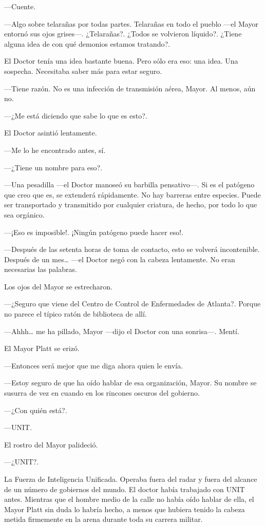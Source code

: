 ---Cuente.

---Algo sobre telarañas por todas partes. Telarañas en todo el pueblo
---el Mayor entornó sus ojos grises---. ¿Telarañas?. ¿Todos se volvieron
líquido?. ¿Tiene alguna idea de con qué demonios estamos tratando?.

El Doctor tenía una idea bastante buena. Pero sólo era eso: una idea.
Una sospecha. Necesitaba saber más para estar seguro.

---Tiene razón. No es una infección de transmisión aérea, Mayor. Al
menos, aún no.

---¿Me está diciendo que sabe lo que es esto?.

El Doctor asintió lentamente.

---Me lo he encontrado antes, sí.

---¿Tiene un nombre para eso?.

---Una pesadilla ---el Doctor manoseó su barbilla pensativo---. Si es el
patógeno que creo que es, se extenderá rápidamente. No hay barreras
entre especies. Puede ser transportado y transmitido por cualquier
criatura, de hecho, por todo lo que sea orgánico.

---¡Eso es imposible!. ¡Ningún patógeno puede hacer eso!.

---Después de las setenta horas de toma de contacto, esto se volverá
incontenible. Después de un mes\ldots{} ---el Doctor negó con la cabeza
lentamente. No eran necesarias las palabras.

Los ojos del Mayor se estrecharon.

---¿Seguro que viene del Centro de Control de Enfermedades de Atlanta?.
Porque no parece el típico ratón de biblioteca de allí.

---Ahhh\ldots{} me ha pillado, Mayor ---dijo el Doctor con una
sonrisa---. Mentí.

El Mayor Platt se erizó.

---Entonces será mejor que me diga ahora quien le envía.

---Estoy seguro de que ha oído hablar de esa organización, Mayor. Su
nombre se susurra de vez en cuando en los rincones oscuros del gobierno.

---¿Con quién está?.

---UNIT.

El rostro del Mayor palideció.

---¿UNIT?.

La Fuerza de Inteligencia Unificada. Operaba fuera del radar y fuera del
alcance de un número de gobiernos del mundo. El doctor había trabajado
con UNIT antes. Mientras que el hombre medio de la calle no había oído
hablar de ella, el Mayor Platt sin duda lo habría hecho, a menos que
hubiera tenido la cabeza metida firmemente en la arena durante toda su
carrera militar.

